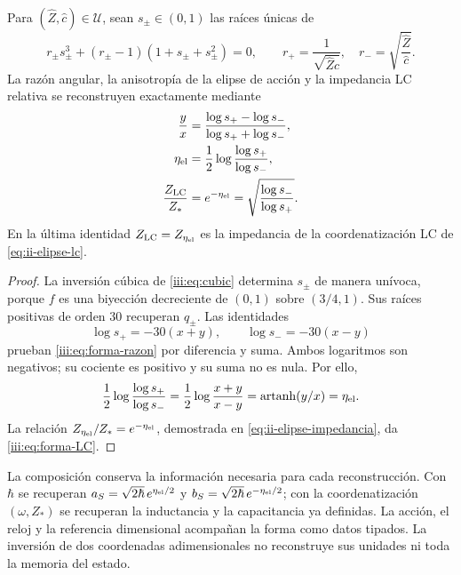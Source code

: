 \begin{proposition}
\label{iii:prop:forma-LC}
Para $(\widehat Z,\widehat c)\in\mathcal U$, sean $s_\pm\in(0,1)$ las
raíces únicas de
\begin{equation}
 r_\pm s_\pm^3+(r_\pm-1)(1+s_\pm+s_\pm^2)=0,
 \qquad
 r_+=\frac1{\sqrt{\widehat Z\widehat c}},\quad
 r_-=\sqrt{\frac{\widehat Z}{\widehat c}}.
 \label{iii:eq:forma-inversion}
\end{equation}
La razón angular, la anisotropía de la elipse de acción y la impedancia
LC relativa se reconstruyen exactamente mediante
\begin{align}
 \frac{y}{x}
 &=\frac{\log s_+-\log s_-}{\log s_++\log s_-},
 \label{iii:eq:forma-razon}\\
 \eta_{\rm el}
 &=\frac12\log\frac{\log s_+}{\log s_-},
 \label{iii:eq:forma-eta}\\
 \frac{Z_{\rm LC}}{Z_*}
 &=e^{-\eta_{\rm el}}
  =\sqrt{\frac{\log s_-}{\log s_+}}.
 \label{iii:eq:forma-LC}
\end{align}
En la última identidad $Z_{\rm LC}=Z_{\eta_{\rm el}}$ es la impedancia
de la coordenatización LC de \eqref{eq:ii-elipse-lc}.
\end{proposition}
\begin{proof}
La inversión cúbica de \eqref{iii:eq:cubic} determina $s_\pm$ de manera
unívoca, porque $f$ es una biyección decreciente de $(0,1)$ sobre
$(3/4,1)$. Sus raíces positivas de orden $30$ recuperan $q_\pm$.
Las identidades
\[
 \log s_+=-30(x+y),\qquad \log s_-=-30(x-y)
\]
prueban \eqref{iii:eq:forma-razon} por diferencia y suma. Ambos logaritmos
son negativos; su cociente es positivo y su suma no es nula. Por ello,
\[
 \frac12\log\frac{\log s_+}{\log s_-}
   =\frac12\log\frac{x+y}{x-y}
   =\operatorname{artanh}(y/x)=\eta_{\rm el}.
\]
La relación $Z_{\eta_{\rm el}}/Z_*=e^{-\eta_{\rm el}}$, demostrada en
\eqref{eq:ii-elipse-impedancia}, da \eqref{iii:eq:forma-LC}.
\end{proof}

La composición conserva la información necesaria para cada reconstrucción.
Con $\hbar$ se recuperan
$a_S=\sqrt{2\hbar}\,e^{\eta_{\rm el}/2}$ y
$b_S=\sqrt{2\hbar}\,e^{-\eta_{\rm el}/2}$; con la coordenatización
$(\omega,Z_*)$ se recuperan la inductancia y la capacitancia ya definidas.
La acción, el reloj y la referencia dimensional acompañan la forma como
datos tipados. La inversión de dos coordenadas adimensionales no
reconstruye sus unidades ni toda la memoria del estado.

